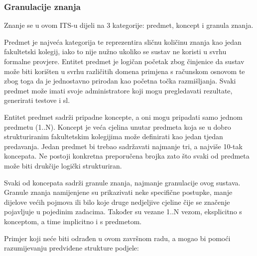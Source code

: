 \documentclass[times, utf8, zavrsni]{fer}
\begin{document}
\subsubsection{Granulacije znanja}
Znanje se u ovom ITS-u dijeli na 3 kategorije: predmet, koncept i granula znanja.
\par 
Predmet je najveća kategorija te reprezentira sličnu količinu znanja kao jedan fakultetski kolegij, iako to nije nužno ukoliko se sustav ne koristi u svrhu formalne provjere. Entitet predmet je logičan početak zbog činjenice da sustav može biti korišten u svrhu različitih domena primjena s računskom osnovom te zbog toga da je jednostavno prirodan kao početna točka razmišljanja. Svaki predmet može imati svoje administratore koji mogu pregledavati rezultate, generirati testove i sl.
\par
Entitet predmet sadrži pripadne koncepte, a oni mogu pripadati samo jednom predmetu (1..N). Koncept je veća cjelina unutar predmeta koja se u dobro strukturiranim fakultetskim kolegijima može definirati kao jedan tjedan predavanja. Jedan predmet bi trebao sadržavati najmanje tri, a najviše 10-tak koncepata. Ne postoji konkretna preporučena brojka zato što svaki od predmeta može biti drukčije logički strukturiran.
\par
Svaki od koncepata sadrži granule znanja, najmanje granulacije ovog sustava. Granule znanja namijenjene su prikazivati neke specifične postupke, manje dijelove većih pojmova ili bilo koje druge nedjeljive cjeline čije se značenje pojavljuje u pojedinim zadacima. Također su vezane 1..N vezom, eksplicitno s konceptom, a time implicitno i s predmetom.
\pagebreak
\par
Primjer koji neće biti odrađen u ovom završnom radu, a mogao bi pomoći razumijevanju predviđene strukture podjele:
\end{document}
